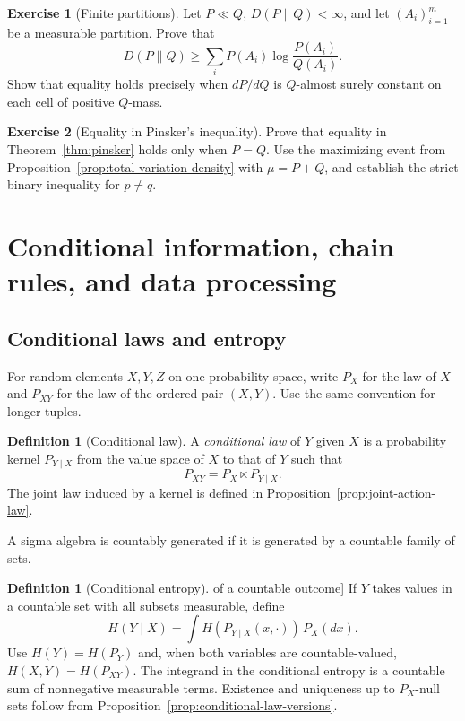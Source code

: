 \documentclass[11pt,oneside]{book}
\theoremstyle{definition}
\newtheorem{definition}[theorem]{Definition}
\newtheorem{exercise}{Exercise}[section]
\theoremstyle{remark}
\begin{document}
\begin{exercise}[Finite partitions]
\label{exer:relative-entropy-finite-partitions}
Let $P\ll Q$, $D(P\|Q)<\infty$, and let $(A_i)_{i=1}^m$ be a
measurable partition. Prove that
\[
D(P\|Q)\geq\sum_i P(A_i)\log\frac{P(A_i)}{Q(A_i)}.
\]
Show that equality holds precisely when $dP/dQ$ is
$Q$-almost surely constant on each cell of positive $Q$-mass.
\end{exercise}

\begin{exercise}[Equality in Pinsker's inequality]
\label{exer:pinsker-equality}
Prove that equality in Theorem~\ref{thm:pinsker} holds only
when $P=Q$. Use the maximizing event from
Proposition~\ref{prop:total-variation-density} with $\mu=P+Q$,
and establish the strict binary inequality for $p\ne q$.
\end{exercise}



\clearpage
\section{Conditional information, chain rules, and data processing}
\label{sec:conditional-information}

\subsection{Conditional laws and entropy}
\label{subsec:conditional-entropy}

For random elements $X,Y,Z$ on one probability space, write $P_X$ for
the law of $X$ and $P_{XY}$ for the law of the ordered pair $(X,Y)$.
Use the same convention for longer tuples.

\begin{definition}[Conditional law]
\label{def:conditional-law}
A \emph{conditional law} of $Y$ given $X$ is a probability kernel
$P_{Y\mid X}$ from the value space of $X$ to that of $Y$ such that
\[
P_{XY}=P_X\ltimes P_{Y\mid X}.
\]
The joint law induced by a kernel is defined in
Proposition~\ref{prop:joint-action-law}.
\end{definition}

A sigma algebra is countably generated if it is generated by a countable
family of sets.

\begin{definition}[Conditional entropy] of a countable outcome]
\label{def:conditional-entropy}
If $Y$ takes values in a countable set with all subsets measurable, define
\[
H(Y\mid X)=\int H(P_{Y\mid X}(x,\cdot))\,P_X(dx).
\]
Use $H(Y)=H(P_Y)$ and, when both variables are countable-valued,
$H(X,Y)=H(P_{XY})$. The integrand in the conditional entropy is a
countable sum of nonnegative measurable terms. Existence and uniqueness
up to $P_X$-null sets follow from Proposition~\ref{prop:conditional-law-versions}.
\end{definition}
\end{document}
